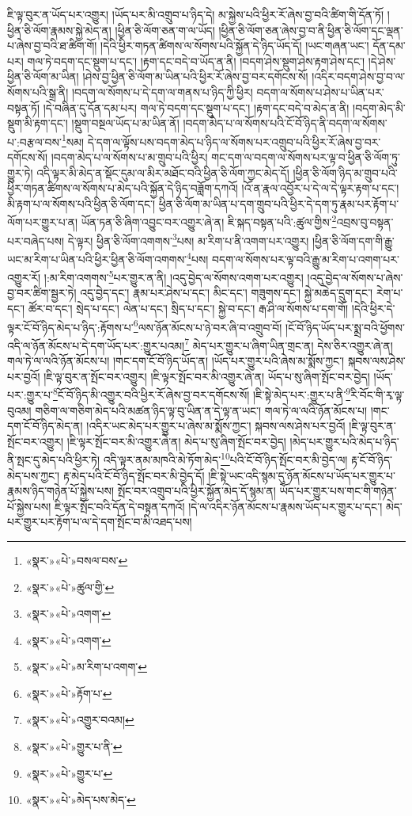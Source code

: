 ཇི་ལྟ་བུར་ན་ཡོད་པར་འགྱུར། །ཡོད་པར་མི་འགྲུབ་པ་ཉིད་དེ། མ་སྐྱེས་པའི་ཕྱིར་རོ་ཞེས་བྱ་བའི་ཚིག་གི་དོན་ཏོ། །ཕྱིན་ཅི་ལོག་རྣམས་སྐྱེ་མེད་ན། །ཕྱིན་ཅི་ལོག་ཅན་ག་ལ་ཡོད། །ཕྱིན་ཅི་ལོག་ཅན་ཞེས་བྱ་བ་ནི་ཕྱིན་ཅི་ལོག་དང་ལྡན་པ་ཞེས་བྱ་བའི་ཐ་ཚིག་གོ། །དེའི་ཕྱིར་གཏན་ཚིགས་ལ་སོགས་པའི་སྐྱོན་དེ་ཉིད་ཡོད་དོ། །ཡང་གཞན་ཡང་། དོན་དམ་པར། གལ་ཏེ་བདག་དང་སྡུག་པ་དང་། །རྟག་དང་བདེ་བ་ཡོད་ན་ནི། །བདག་ཤེས་སྡུག་ཤེས་རྟག་ཤེས་དང་། །དེ་ཤེས་ཕྱིན་ཅི་ལོག་མ་ཡིན། །ཤེས་བྱ་ཕྱིན་ཅི་ལོག་མ་ཡིན་པའི་ཕྱིར་རོ་ཞེས་བྱ་བར་དགོངས་སོ། །འདིར་བདག་ཤེས་བྱ་བ་ལ་སོགས་པའི་སྒྲ་ནི། །བདག་ལ་སོགས་པ་དེ་དག་ལ་གནས་པ་ཉིད་ཀྱི་ཕྱིར། བདག་ལ་སོགས་པ་ཤེས་པ་ཡིན་པར་བསྟན་ཏོ། །དེ་བཞིན་དུ་དོན་དམ་པར། གལ་ཏེ་བདག་དང་སྡུག་པ་དང་། །རྟག་དང་བདེ་བ་མེད་ན་ནི། །བདག་མེད་མི་སྡུག་མི་རྟག་དང་། །སྡུག་བསྔལ་ཡོད་པ་མ་ཡིན་ནོ། །བདག་མེད་པ་ལ་སོགས་པའི་ངོ་བོ་ཉིད་ནི་བདག་ལ་སོགས་པ་:བརྩལ་བས་\footnote{«སྣར་»«པེ་»བསལ་བས་}སམ། དེ་དག་ལ་ལྟོས་པས་བདག་མེད་པ་ཉིད་ལ་སོགས་པར་འགྲུབ་པའི་ཕྱིར་རོ་ཞེས་བྱ་བར་དགོངས་སོ། །བདག་མེད་པ་ལ་སོགས་པ་མ་གྲུབ་པའི་ཕྱིར། གང་དག་ལ་བདག་ལ་སོགས་པར་ལྟ་བ་ཕྱིན་ཅི་ལོག་ཏུ་གྱུར་ཏེ། འདི་ལྟར་མི་མེད་ན་སྡོང་དུམ་ལ་མིར་མཐོང་བའི་ཕྱིན་ཅི་ལོག་ཀྱང་མེད་དོ། །ཕྱིན་ཅི་ལོག་ཉིད་མ་གྲུབ་པའི་ཕྱིར་གཏན་ཚིགས་ལ་སོགས་པ་མེད་པའི་སྐྱོན་དེ་ཉིད་བཟློག་དཀའོ། །འོ་ན་རྣལ་འབྱོར་པ་དེ་ལ་དེ་ལྟར་རྟག་པ་དང་། མི་རྟག་པ་ལ་སོགས་པའི་ཕྱིན་ཅི་ལོག་དང་། ཕྱིན་ཅི་ལོག་མ་ཡིན་པ་དག་གྲུབ་པའི་ཕྱིར་དེ་དག་ཏུ་རྣམ་པར་རྟོག་པ་ལོག་པར་གྱུར་པ་ན། ཡོན་ཏན་ཅི་ཞིག་འབྱུང་བར་འགྱུར་ཞེ་ན། ཇི་སྐད་བསྟན་པའི་:ཚུལ་གྱིས་\footnote{«སྣར་»«པེ་»ཚུལ་གྱི་}འབྲས་བུ་བསྟན་པར་བཞེད་པས། དེ་ལྟར། ཕྱིན་ཅི་ལོག་འགགས་\footnote{«སྣར་»«པེ་»འགག་}པས། མ་རིག་པ་ནི་འགག་པར་འགྱུར། །ཕྱིན་ཅི་ལོག་དག་གི་རྒྱུ་ཡང་མ་རིག་པ་ཡིན་པའི་ཕྱིར་ཕྱིན་ཅི་ལོག་འགགས་\footnote{«སྣར་»«པེ་»འགག་}པས། བདག་ལ་སོགས་པར་ལྟ་བའི་རྒྱུ་མ་རིག་པ་འགག་པར་འགྱུར་རོ། །:མ་རིག་འགགས་\footnote{«སྣར་»«པེ་»མ་རིག་པ་འགག་}པར་གྱུར་ན་ནི། །འདུ་བྱེད་ལ་སོགས་འགག་པར་འགྱུར། །འདུ་བྱེད་ལ་སོགས་པ་ཞེས་བྱ་བར་ཚིག་སྦྱར་ཏེ། འདུ་བྱེད་དང་། རྣམ་པར་ཤེས་པ་དང་། མིང་དང་། གཟུགས་དང་། སྐྱེ་མཆེད་དྲུག་དང་། རེག་པ་དང་། ཚོར་བ་དང་། སྲེད་པ་དང་། ལེན་པ་དང་། སྲིད་པ་དང་། སྐྱེ་བ་དང་། རྒ་ཤི་ལ་སོགས་པ་དག་གོ། །དེའི་ཕྱིར་དེ་ལྟར་ངོ་བོ་ཉིད་མེད་པ་ཉིད་:རྟོགས་པ་\footnote{«སྣར་»«པེ་»རྟོག་པ་}ལས་ཉོན་མོངས་པ་ཉེ་བར་ཞི་བ་འགྲུབ་བོ། །ངོ་བོ་ཉིད་ཡོད་པར་སྨྲ་བའི་ཕྱོགས་འདི་ལ་ཉོན་མོངས་པ་དེ་དག་ཡོད་པར་:གྱུར་པའམ།\footnote{«སྣར་»«པེ་»འགྱུར་བའམ།} མེད་པར་གྱུར་པ་ཞིག་ཡིན་གྲང་ན། དེས་ཅིར་འགྱུར་ཞེ་ན། གལ་ཏེ་ལ་ལའི་ཉོན་མོངས་པ། །གང་དག་ངོ་བོ་ཉིད་ཡོད་ན། །ཡོད་པར་གྱུར་པའི་ཞེས་མ་སྨོས་ཀྱང་། སྐབས་ལས་ཤེས་པར་བྱའོ། །ཇི་ལྟ་བུར་ན་སྤོང་བར་འགྱུར། །ཇི་ལྟར་སྤོང་བར་མི་འགྱུར་ཞེ་ན། ཡོད་པ་སུ་ཞིག་སྤོང་བར་བྱེད། །ཡོད་པར་:གྱུར་པ་\footnote{«སྣར་»«པེ་»གྱུར་པ་ནི་}ངོ་བོ་ཉིད་མི་འགྱུར་བའི་ཕྱིར་རོ་ཞེས་བྱ་བར་དགོངས་སོ། །ཇི་སྟེ་མེད་པར་:གྱུར་པ་ནི་\footnote{«སྣར་»«པེ་»གྱུར་པ་}རི་བོང་གི་རྭ་ལྟ་བུའམ། གཅིག་ལ་གཅིག་མེད་པའི་མཚན་ཉིད་ལྟ་བུ་ཡིན་ན་དེ་ལྟ་ན་ཡང་། གལ་ཏེ་ལ་ལའི་ཉོན་མོངས་པ། །གང་དག་ངོ་བོ་ཉིད་མེད་ན། །འདིར་ཡང་མེད་པར་གྱུར་པ་ཞེས་མ་སྨོས་ཀྱང་། སྐབས་ལས་ཤེས་པར་བྱའོ། །ཇི་ལྟ་བུར་ན་སྤོང་བར་འགྱུར། །ཇི་ལྟར་སྤོང་བར་མི་འགྱུར་ཞེ་ན། མེད་པ་སུ་ཞིག་སྤོང་བར་བྱེད། །མེད་པར་གྱུར་པའི་མེད་པ་ཉིད་ནི་སྤང་དུ་མེད་པའི་ཕྱིར་ཏེ། འདི་ལྟར་ནམ་མཁའི་མེ་ཏོག་མེད་\footnote{«སྣར་»«པེ་»མེད་པས་མེད་}པའི་ངོ་བོ་ཉིད་སྤོང་བར་མི་བྱེད་ལ། རྟ་ངོ་བོ་ཉིད་མེད་པས་ཀྱང་། རྟ་མེད་པའི་ངོ་བོ་ཉིད་སྤོང་བར་མི་བྱེད་དོ། །ཇི་སྟེ་ཡང་འདི་སྙམ་དུ་ཉོན་མོངས་པ་ཡོད་པར་གྱུར་པ་རྣམས་ཉིད་གཉེན་པོ་སྐྱེས་པས། སྤོང་བར་འགྲུབ་པའི་ཕྱིར་སྐྱོན་མེད་དོ་སྙམ་ན། ཡོད་པར་གྱུར་པས་གང་གི་གཉེན་པོ་སྐྱེས་པས། ཇི་ལྟར་སྤོང་བའི་དོན་དེ་བསྟན་དཀའོ། །དེ་ལ་འདིར་ཉོན་མོངས་པ་རྣམས་ཡོད་པར་གྱུར་པ་དང་། མེད་པར་གྱུར་པར་རྟོག་པ་ལ་དེ་དག་སྤོང་བ་མི་འཐད་པས། 